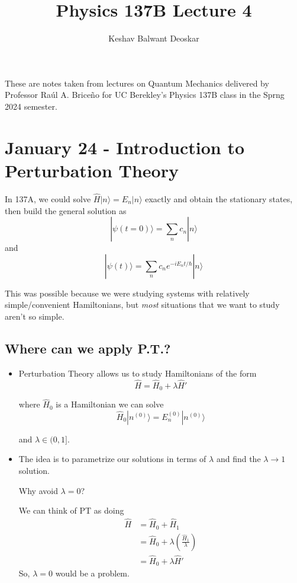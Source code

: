 \documentclass{article}
\title{Physics 137B Lecture 4}
\author{Keshav Balwant Deoskar}
\newcommand{\ket}[1]{|#1 \rangle}
\begin{document}
\maketitle

These are notes taken from lectures on Quantum Mechanics delivered by Professor Raúl A. Briceño for UC Berekley's Physics 137B class in the Sprng 2024 semester.

\tableofcontents

\pagebreak

\section{January 24 - Introduction to Perturbation Theory}

\vskip 0.5cm
In 137A, we could solve $\hat{H} \ket{n} = E_n \ket{n}$ exactly and obtain the stationary states, then build the general solution as 
\[ \ket{\psi(t = 0)} = \sum_{n} c_n \ket{n} \]
and 
\[ \ket{\psi(t)} = \sum_{n} c_n e^{-iE_n t / \hbar} \ket{n} \]

This was possible because we were studying systems with relatively simple/convenient Hamiltonians, but \emph{most} situations that we want to study aren't so simple.

\vskip 1cm
\subsection*{Where can we apply P.T.?}

\begin{itemize}
  \item Perturbation Theory allows us to study Hamiltonians of the form 
  \[ \hat{H} = \hat{H}_0 + \lambda \hat{H}' \]
  
  where $\hat{H}_0$ is a Hamiltonian we can solve 
  \[ \hat{H}_0 \ket{n^{(0)}} = E_n^{(0)} \ket{n^{(0)}} \]
  
  and $\lambda \in (0, 1]$.

  \vskip 0.5cm
  \item The idea is to parametrize our solutions in terms of $\lambda$ and find the $\lambda \rightarrow 1$ solution.
  
  \begin{dottedbox}
    Why avoid $\lambda = 0$? 
    \vskip 0.5cm
    
    We can think of PT as doing 
    \begin{align*}
      \hat{H} &= \hat{H}_0 + \hat{H}_1 \\
              &= \hat{H}_0 + \lambda \left( \frac{\hat{H}_1}{\lambda} \right) \\
              &= \hat{H}_0 + \lambda \hat{H}'
    \end{align*}
    So, $\lambda = 0$ would be a problem.
  \end{dottedbox}
\end{itemize}
\end{document}
